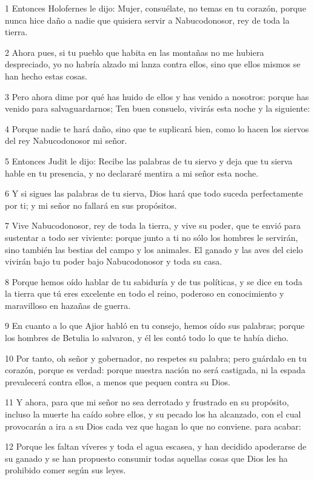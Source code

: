 \par 1 Entonces Holofernes le dijo: Mujer, consuélate, no temas en tu corazón, porque nunca hice daño a nadie que quisiera servir a Nabucodonosor, rey de toda la tierra.
\par 2 Ahora pues, si tu pueblo que habita en las montañas no me hubiera despreciado, yo no habría alzado mi lanza contra ellos, sino que ellos mismos se han hecho estas cosas.
\par 3 Pero ahora dime por qué has huido de ellos y has venido a nosotros: porque has venido para salvaguardarnos; Ten buen consuelo, vivirás esta noche y la siguiente:
\par 4 Porque nadie te hará daño, sino que te suplicará bien, como lo hacen los siervos del rey Nabucodonosor mi señor.
\par 5 Entonces Judit le dijo: Recibe las palabras de tu siervo y deja que tu sierva hable en tu presencia, y no declararé mentira a mi señor esta noche.
\par 6 Y si sigues las palabras de tu sierva, Dios hará que todo suceda perfectamente por ti; y mi señor no fallará en sus propósitos.
\par 7 Vive Nabucodonosor, rey de toda la tierra, y vive su poder, que te envió para sustentar a todo ser viviente: porque junto a ti no sólo los hombres le servirán, sino también las bestias del campo y los animales. El ganado y las aves del cielo vivirán bajo tu poder bajo Nabucodonosor y toda su casa.
\par 8 Porque hemos oído hablar de tu sabiduría y de tus políticas, y se dice en toda la tierra que tú eres excelente en todo el reino, poderoso en conocimiento y maravilloso en hazañas de guerra.
\par 9 En cuanto a lo que Ajior habló en tu consejo, hemos oído sus palabras; porque los hombres de Betulia lo salvaron, y él les contó todo lo que te había dicho.
\par 10 Por tanto, oh señor y gobernador, no respetes su palabra; pero guárdalo en tu corazón, porque es verdad: porque nuestra nación no será castigada, ni la espada prevalecerá contra ellos, a menos que pequen contra su Dios.
\par 11 Y ahora, para que mi señor no sea derrotado y frustrado en su propósito, incluso la muerte ha caído sobre ellos, y su pecado los ha alcanzado, con el cual provocarán a ira a su Dios cada vez que hagan lo que no conviene. para acabar:
\par 12 Porque les faltan víveres y toda el agua escasea, y han decidido apoderarse de su ganado y se han propuesto consumir todas aquellas cosas que Dios les ha prohibido comer según sus leyes.
